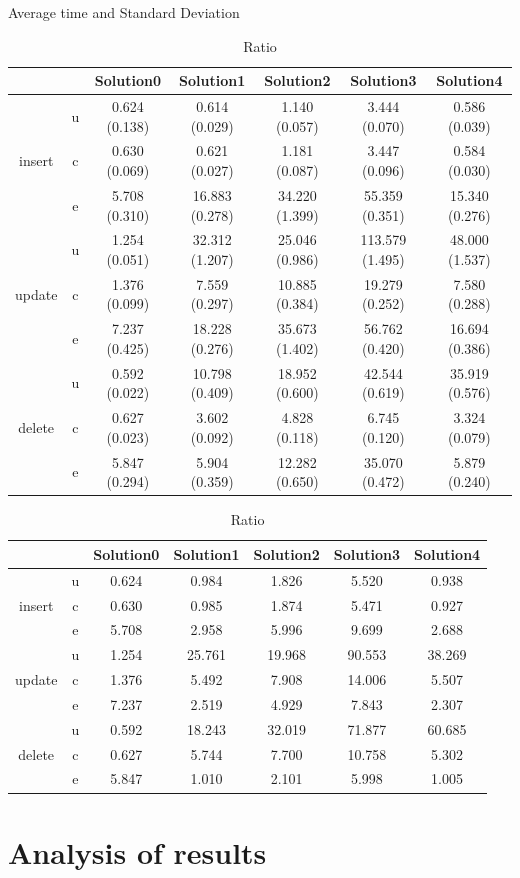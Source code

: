 \newcommand{\B}[1]{\colorbox{light-gray}{#1}} %
\begin{table} 
\centering
\caption{Average time and Standard Deviation}
\begin{tabular}{ccc cccc}
\toprule
&&Solution0 & Solution1 & Solution2 & Solution3 & Solution4\\
\midrule
\multirow{3}{*}{insert} & u & 0.624 (0.138) & \B{ 0.614 (0.029)} & 1.140 (0.057)
& 3.444 (0.070) & 0.586 (0.039)\\
 & c & 0.630 (0.069) & 0.621 (0.027) & 1.181 (0.087) & 3.447 (0.096) & 0.584 (0.030)\\
 & e & 5.708 (0.310) & 16.883 (0.278) & 34.220 (1.399) & 55.359 (0.351) & 15.340 (0.276)\\
\midrule
\multirow{3}{*}{update} & u & 1.254 (0.051) & 32.312 (1.207) & 25.046 (0.986) & 113.579 (1.495) & 48.000 (1.537)\\
 & c & 1.376 (0.099) & 7.559 (0.297) & 10.885 (0.384) & 19.279 (0.252) & 7.580 (0.288)\\
 & e & 7.237 (0.425) & 18.228 (0.276) & 35.673 (1.402) & 56.762 (0.420) & 16.694 (0.386)\\
\midrule
\multirow{3}{*}{delete} & u & 0.592 (0.022) & 10.798 (0.409) & 18.952 (0.600) & 42.544 (0.619) & 35.919 (0.576)\\
 & c & 0.627 (0.023) & 3.602 (0.092) & 4.828 (0.118) & 6.745 (0.120) & 3.324 (0.079)\\
 & e & 5.847 (0.294) & 5.904 (0.359) & 12.282 (0.650) & 35.070 (0.472) & 5.879 (0.240)\\
\bottomrule
\end{tabular}

 \centering
\caption{Ratio}\label{t:}
\begin{tabular}{ccccccc}
\toprule
&&Solution0 & Solution1 & Solution2 & Solution3 & Solution4\\
\midrule
\multirow{3}{*}{insert} & u & 0.624 & 0.984 & 1.826 & 5.520 & 0.938\\
 & c & 0.630 & 0.985 & 1.874 & 5.471 & 0.927\\
 & e & 5.708 & 2.958 & 5.996 & 9.699 & 2.688\\
\midrule
\multirow{3}{*}{update} & u & 1.254 & 25.761 & 19.968 & 90.553 & 38.269\\
 & c & 1.376 & 5.492 & 7.908 & 14.006 & 5.507\\
 & e & 7.237 & 2.519 & 4.929 & 7.843 & 2.307\\
\midrule
\multirow{3}{*}{delete} & u & 0.592 & 18.243 & 32.019 & 71.877 & 60.685\\
 & c & 0.627 & 5.744 & 7.700 & 10.758 & 5.302\\
 & e & 5.847 & 1.010 & 2.101 & 5.998 & 1.005\\
\bottomrule
\end{tabular}
\end{table}

\section{Analysis of results}



